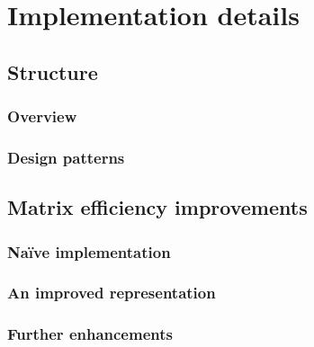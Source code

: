 \chapter{Implementation details}
\label{ch:implementation}

\section{Structure}

\subsection{Overview}

\subsection{Design patterns}

\section{Matrix efficiency improvements}
\label{sec:efficiency}

\subsection{Na\"{i}ve implementation}

\subsection{An improved representation}

\subsection{Further enhancements}

